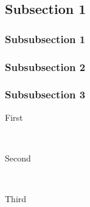 \documentclass[12pt]{article} %
\begin{document}
\subsection{Subsection 1} %

\subsubsection{Subsubsection 1} %



\subsubsection{Subsubsection 2} %



\subsubsection{Subsubsection 3} %

\begin{description} %

\item[First] \hfill \\


\item[Second] \hfill \\

\item[Third] \hfill \\


\end{description} 




\end{document}
